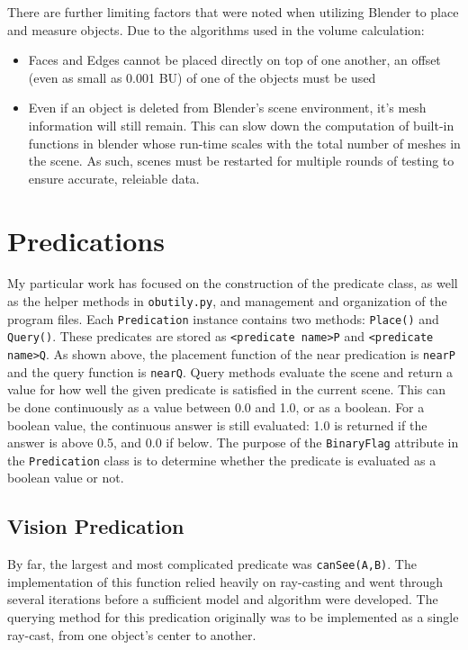 There are further limiting factors that were noted when utilizing Blender to place and measure objects. Due to the algorithms used in the volume calculation:

\begin{center}
	\begin{itemize}
		\item Faces and Edges cannot be placed directly on top of one another, an offset (even as small as 0.001 BU) of one of the objects must be used
		\item Even if an object is deleted from Blender's scene environment, it's mesh information will still remain. This can slow down the computation of built-in functions in blender whose run-time scales with the total number of meshes in the scene. As such, scenes must be restarted for multiple rounds of testing to ensure accurate, releiable data.
	\end{itemize}
\end{center}

\section{Predications}
My particular work has focused on the construction of the predicate class, as well as the helper methods in \texttt{obutily.py}, and management and organization of the program files.
Each \texttt{Predication} instance contains two methods: \texttt{Place()} and \texttt{Query()}. These predicates are stored as \texttt{\textless predicate name\textgreater P} and \texttt{\textless predicate name\textgreater Q}. 
As shown above, the placement function of the near predication is \texttt{nearP} and the query function is \texttt{nearQ}. Query methods evaluate the scene and return a value for how well the given predicate is satisfied in the current scene. 
This can be done continuously as a value between 0.0 and 1.0, or as a boolean. 
For a boolean value, the continuous answer is still evaluated: 1.0 is returned if the answer is above 0.5, and 0.0 if below.
The purpose of the \texttt{BinaryFlag} attribute in the \texttt{Predication} class is to determine whether the predicate is evaluated as a boolean value or not.



\subsection{Vision Predication}
By far, the largest and most complicated predicate was \texttt{canSee(A,B)}.
The implementation of this function relied heavily on ray-casting and went through several iterations before a sufficient model and algorithm were developed. 
The querying method for this predication originally was to be implemented as a single ray-cast, from one object's center to another.

